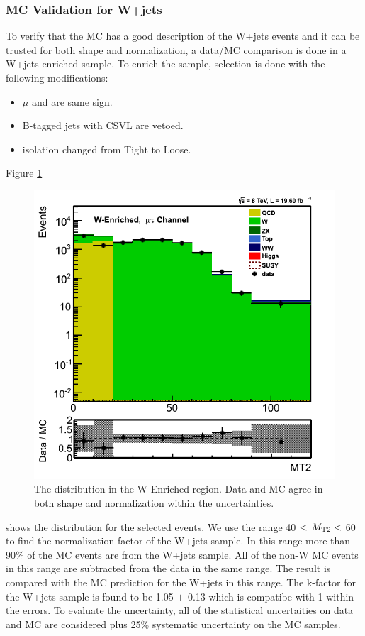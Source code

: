 \subsubsection{MC Validation for W+jets}
To verify that the MC has a good description of the W+jets events and it can be trusted for both shape and normalization, a data/MC comparison 
is done in a W+jets enriched sample. To enrich the sample, \muTau selection is done with the following modifications:
\begin{itemize}
\item $\mu$ and \Tau are same sign.
\item B-tagged jets with CSVL are vetoed.
\item \Tau isolation changed from Tight to Loose.
\end{itemize}
Figure \ref{fig:mt2_WValidation} 
\begin{figure}[htbp]
\centering
\includegraphics[angle=0,scale=0.35]{TauTauFigs/MT2_WValidation.png}
\caption{The \mttwo distribution in the W-Enriched region. Data and MC agree in both shape and normalization within the uncertainties.}
\label{fig:mt2_WValidation}
\end{figure}
shows the \mttwo distribution for the selected events. We use the range 40 $<\,{M_{\rm T2}}<$ 60 \GeV to find the normalization factor of the 
W+jets sample. In this range more than 90\% of the MC events are from the W+jets sample. 
All of the non-W MC events in this range are subtracted from 
the data in the same range. The result is compared with the MC prediction for the W+jets in this range. The k-factor for the W+jets sample is 
found to be 1.05 $\pm$ 0.13 which is compatibe with 1 within the errors. To evaluate the uncertainty, all of the statistical uncertaities on data 
and MC are considered plus 25\% systematic uncertainty on the MC samples.

